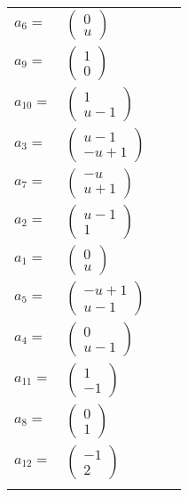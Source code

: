 \documentclass[1p]{elsarticle_modified}
\theoremstyle{definition}
\begin{document}
\begin{tabular}{m{7pt} m{180pt} m{7pt} m{180pt} }
\flushright $a_{6}=$&$\begin{pmatrix}0\\u\end{pmatrix}$ \\
\flushright $a_{9}=$&$\begin{pmatrix}1\\0\end{pmatrix}$ \\
\flushright $a_{10}=$&$\begin{pmatrix}1\\u-1\end{pmatrix}$ \\
\flushright $a_{3}=$&$\begin{pmatrix}u-1\\- u+1\end{pmatrix}$ \\
\flushright $a_{7}=$&$\begin{pmatrix}- u\\u+1\end{pmatrix}$ \\
\flushright $a_{2}=$&$\begin{pmatrix}u-1\\1\end{pmatrix}$ \\
\flushright $a_{1}=$&$\begin{pmatrix}0\\u\end{pmatrix}$ \\
\flushright $a_{5}=$&$\begin{pmatrix}- u+1\\u-1\end{pmatrix}$ \\
\flushright $a_{4}=$&$\begin{pmatrix}0\\u-1\end{pmatrix}$ \\
\flushright $a_{11}=$&$\begin{pmatrix}1\\-1\end{pmatrix}$ \\
\flushright $a_{8}=$&$\begin{pmatrix}0\\1\end{pmatrix}$ \\
\flushright $a_{12}=$&$\begin{pmatrix}-1\\2\end{pmatrix}$\\&\end{tabular}
\end{document}
